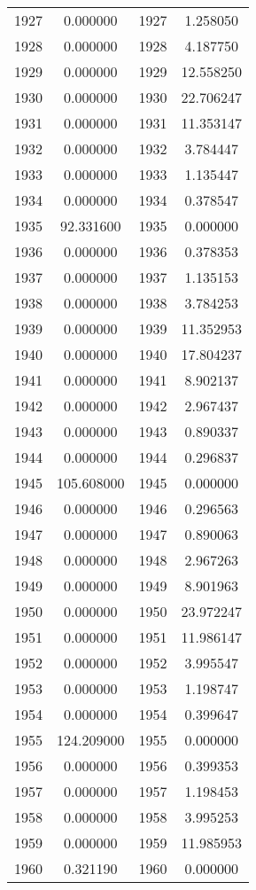 \documentclass[12pt]{article}
\begin{document}
\begin{longtable}{@{}cccc@{}}
1927 & 0.000000 & 1927 & 1.258050 \\
1928 & 0.000000 & 1928 & 4.187750 \\
1929 & 0.000000 & 1929 & 12.558250 \\
1930 & 0.000000 & 1930 & 22.706247 \\
1931 & 0.000000 & 1931 & 11.353147 \\
1932 & 0.000000 & 1932 & 3.784447 \\
1933 & 0.000000 & 1933 & 1.135447 \\
1934 & 0.000000 & 1934 & 0.378547 \\
1935 & 92.331600 & 1935 & 0.000000 \\
1936 & 0.000000 & 1936 & 0.378353 \\
1937 & 0.000000 & 1937 & 1.135153 \\
1938 & 0.000000 & 1938 & 3.784253 \\
1939 & 0.000000 & 1939 & 11.352953 \\
1940 & 0.000000 & 1940 & 17.804237 \\
1941 & 0.000000 & 1941 & 8.902137 \\
1942 & 0.000000 & 1942 & 2.967437 \\
1943 & 0.000000 & 1943 & 0.890337 \\
1944 & 0.000000 & 1944 & 0.296837 \\
1945 & 105.608000 & 1945 & 0.000000 \\
1946 & 0.000000 & 1946 & 0.296563 \\
1947 & 0.000000 & 1947 & 0.890063 \\
1948 & 0.000000 & 1948 & 2.967263 \\
1949 & 0.000000 & 1949 & 8.901963 \\
1950 & 0.000000 & 1950 & 23.972247 \\
1951 & 0.000000 & 1951 & 11.986147 \\
1952 & 0.000000 & 1952 & 3.995547 \\
1953 & 0.000000 & 1953 & 1.198747 \\
1954 & 0.000000 & 1954 & 0.399647 \\
1955 & 124.209000 & 1955 & 0.000000 \\
1956 & 0.000000 & 1956 & 0.399353 \\
1957 & 0.000000 & 1957 & 1.198453 \\
1958 & 0.000000 & 1958 & 3.995253 \\
1959 & 0.000000 & 1959 & 11.985953 \\
1960 & 0.321190 & 1960 & 0.000000 \\

\end{longtable}
\end{document}
